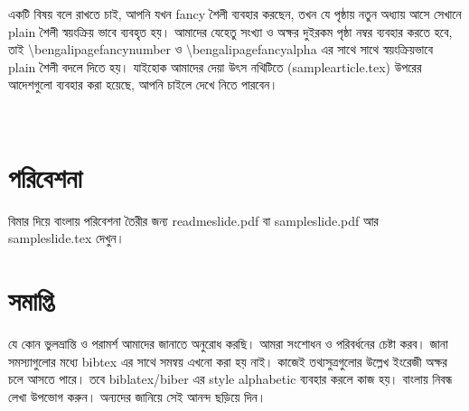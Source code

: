 \documentclass[a4paper,10pt,xetex]{article}
\begin{document}
একটি বিষয় বলে রাখতে চাই, আপনি যখন fancy শৈলী ব্যবহার করছেন, তখন যে পৃষ্ঠায় নতুন অধ্যায় আসে সেখানে plain শৈলী স্বয়ংক্রিয় ভাবে ব্যবহৃত হয়। আমাদের যেহেতু সংখ্যা ও অক্ষর দুইরকম পৃষ্ঠা নম্বর ব্যবহার করতে হবে, তাই \textbackslash{\rm bengalipagefancynumber} ও \textbackslash{\rm bengalipagefancyalpha} এর সাথে সাথে স্বয়ংক্রিয়ভাবে plain শৈলী বদলে দিতে হয়। যাইহোক আমাদের দেয়া উৎস নথিটিতে (samplearticle.tex) উপরের আদেশগুলো ব্যবহার করা হয়েছে, আপনি চাইলে দেখে নিতে পারবেন।

‌\section{পরিবেশনা}
বিমার দিয়ে বাংলায় পরিবেশনা তৈরীর জন্য readmeslide.pdf বা sampleslide.pdf আর sampleslide.tex দেখুন।

\section{সমাপ্তি}
যে কোন ভুলভ্রান্তি ও পরামর্শ আমাদের জানাতে অনুরোধ করছি। আমরা সংশোধন ও পরিবর্ধনের চেষ্টা করব। জানা সমস্যাগুলোর মধ্যে bibtex এর সাথে সমন্বয় এখনো করা হয় নাই। কাজেই তথ্যসুত্রগুলোর উল্লেখ ইংরেজী অক্ষর চলে আসতে পারে। তবে biblatex/biber এর style alphabetic ব্যবহার করলে কাজ হয়। বাংলায় নিবন্ধ লেখা উপভোগ করুন। অন্যদের জানিয়ে সেই আনন্দ ছড়িয়ে দিন।

%

\printbibliography


\end{document}
